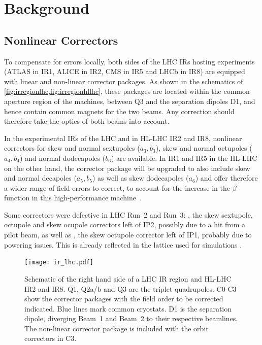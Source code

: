\section{Background}

\subsection{Nonlinear Correctors}

To compensate for errors locally, both sides of the LHC IRs hosting experiments 
(ATLAS in IR1, ALICE in IR2, CMS in IR5 and LHCb in IR8) are equipped with linear and non-linear corrector packages.
As shown in the schematics of \cref{fig:irregionlhc,fig:irregionhllhc}, 
these packages are located within the common aperture region of the machines, between Q3 and the separation dipoles D1,
and hence contain common magnets for the two beams. 
Any correction should therefore take the optics of both beams into account.

In the experimental IRs of the LHC and in HL-LHC IR2 and IR8, nonlinear correctors for
skew and normal sextupoles ($a_3, b_3$), skew and normal octupoles ($a_4, b_4$) 
and normal dodecapoles ($b_6$) are available.
In IR1 and IR5 in the HL-LHC on the other hand, the corrector package will be upgraded to 
also include skew and normal decapoles ($a_5, b_5$) as well as skew dodecapoles ($a_6$)
and offer therefore a wider range of field errors to correct, to account for the 
increase in the $\beta$-function in this high-performance 
machine~\cite{AberleHighLuminosityLargeHadron2020,DeMariaHighLuminosityLHC2019,BuffatOpticsMeasurementCorrection2022}.


Some correctors were defective in LHC Run~2 and Run~3:
, the skew sextupole, octupole and skew ocupole correctors left of IP2, possibly due to a hit from a pilot beam,
as well as , the skew octupole corrector left of IP1, probably due to powering issues. 
This is already reflected in the lattice used for simulations \cite{DeMariaCERNOpticsRepository}.


\begin{figure}[h!]
    \centering
    \texttt{[image: ir\_lhc.pdf]}
    \caption{Schematic of the right hand side of a LHC IR region and HL-LHC IR2 and IR8.
    Q1, Q2a/b and Q3 are the triplet quadrupoles.
    C0-C3 show the corrector packages with the field order to be corrected indicated. 
    Blue lines mark common cryostats. 
    D1 is the separation dipole, diverging Beam~1 and Beam~2
    to their respective beamlines. 
    The non-linear corrector package is included with the orbit correctors in C3.
    }
    \label{fig:irregionlhc}
\end{figure}


